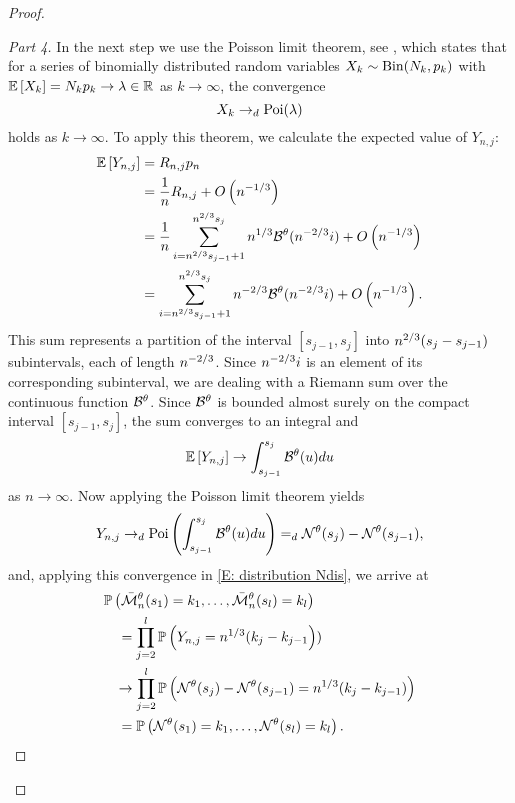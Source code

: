\begin{proof}
\begin{proof}[Part 4]
In the next step we use the Poisson limit theorem, see \cite[Theorem 3.7, p.79]{Klenke.2006},
which states that for a series of binomially distributed random variables $X_k \sim \operatorname*{Bin}(N_k, p_k)$
with $\mathbb{E} \left[ X_k \right] = N_k p_k \rightarrow \lambda \in \mathbb{R}$ as $k \rightarrow \infty$,
the convergence 
\begin{equation}
	X_k \rightarrow_d \operatorname*{Poi}(\lambda)
\end{equation}
holds as $k \rightarrow \infty$.
To apply this theorem, we calculate the expected value of $Y_{n,j}$:
\begin{align*}
\mathbb{E} \left[ Y_{n,j} \right] 
&= R_{n,j} p_n \\
&= \frac{1}{n} R_{n,j} + O\left(n^{-1 / 3}\right)\\
&= \frac{1}{n} \sum_{i=n^{2 / 3}s_{j-1}+1}^{n^{2 / 3}s_j}n^{1 / 3}\mathcal{B}^{\theta}(n^{-2 / 3}i) + O\left(n^{-1 / 3}\right)\\
&= \sum_{i=n^{2 / 3}s_{j-1}+1}^{n^{2 / 3}s_j}n^{-2 / 3}\mathcal{B}^{\theta}(n^{-2 / 3}i) + O\left(n^{-1 / 3}\right).
\end{align*}
This sum represents a partition of the interval $[s_{j-1}, s_j]$ into $n^{2 / 3}(s_j - s_{j-1})$ subintervals, each of length $n^{-2 / 3}$.
Since $n^{-2 / 3}i$ is an element of its corresponding subinterval, 
we are dealing with a Riemann sum over the continuous function $\mathcal{B}^{\theta}$.
Since $\mathcal{B}^{\theta}$ is bounded almost surely on the compact interval $[s_{j-1}, s_j]$,
the sum converges to an integral and
\begin{equation*}
\mathbb{E} \left[ Y_{n,j} \right] \rightarrow \int_{s_{j-1}}^{s_j} \mathcal{B}^{\theta}(u)du
\end{equation*}
as $n \rightarrow \infty$. 
Now applying the Poisson limit theorem yields
\begin{equation} \label{E: convergence dist Yj}
Y_{n,j} \rightarrow_d \operatorname*{Poi}\left( \int_{s_{j-1}}^{s_j} \mathcal{B}^{\theta}(u)du \right) =_d \mathcal{N}^{\theta}(s_j) - \mathcal{N}^{\theta}(s_{j-1}),
\end{equation}
and, applying this convergence in \eqref{E: distribution Ndis}, we arrive at
\begin{equation*}
\begin{aligned}
&\mathbb{P}\left(\bar{\mathcal{M}}_n^{\theta}(s_1) = k_1, \dots, \bar{\mathcal{M}}_n^{\theta}(s_l) = k_l\right) \\
&\quad = \prod_{j=2}^{l} \mathbb{P}\left( Y_{n,j} = n^{1 / 3}(k_j - k_{j-1}\right) ) \\
&\hspace{8pt} \rightarrow \prod_{j=2}^{l} \mathbb{P}\left( \mathcal{N}^{\theta}(s_j) - \mathcal{N}^{\theta}(s_{j-1}) = n^{1 / 3}(k_j - k_{j-1}) \right) \\
&\quad = \mathbb{P}\left(\mathcal{N}^{\theta}(s_1) = k_1, \dots, \mathcal{N}^{\theta}(s_l) = k_l\right).
\end{aligned}
\end{equation*}


\end{proof}
\end{proof}
